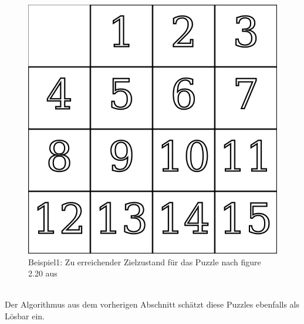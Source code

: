 \begin{minipage}{\linewidth}
\begin{minipage}[t]{0.45\linewidth}
\begin{figure}[H]
			\includegraphics[width=\linewidth,keepaspectratio]{img/End_Puzzle_Stroetmann.png}
			\captionsetup{format=plain, indention=0pt}
			\caption{\label{fig:Ex1_end}Beispiel1: Zu erreichender Zielzustand für das Puzzle nach figure 2.20 aus \autocite{github-stroetmann:online}}
		\end{figure}
	\end{minipage}
\end{minipage}\\\WNL%
Der Algorithmus aus dem vorherigen Abschnitt schätzt diese Puzzles ebenfalls als Lösbar ein.\\
